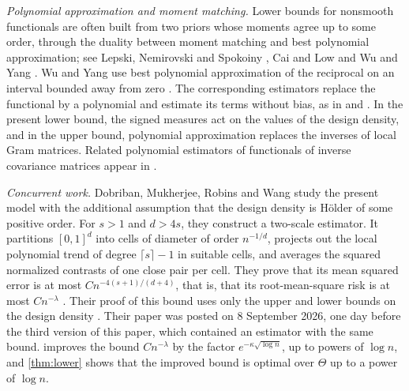 \emph{Polynomial approximation and moment matching.} Lower bounds for
nonsmooth functionals are often built from two priors whose moments
agree up to some order, through the duality between moment matching
and best polynomial approximation; see Lepski, Nemirovski and Spokoiny
\cite[Section~4.4]{LepskiEtAl1999}, Cai and Low \cite{CaiLow2011} and
Wu and Yang \cite{WuYang2019}. Wu and Yang use best polynomial
approximation of the reciprocal on an interval bounded away from zero
\cite[Appendix~A]{WuYang2019}. The corresponding estimators replace the
functional by a polynomial and estimate its terms without bias, as in
\cite[Section~4.1]{CaiLow2011} and \cite{JiaoEtAl2015}. In the present
lower bound, the signed measures act on the values of the design
density, and in the upper bound, polynomial approximation replaces the
inverses of local Gram matrices. Related polynomial estimators of
functionals of inverse covariance matrices appear in
\cite{KongValiant2018,ChenLiuMukherjee2024}.

\emph{Concurrent work.} Dobriban, Mukherjee, Robins and Wang
\cite{DobribanEtAl2026} study the present model with the additional
assumption that the design density is H\"older of some positive order.
For $s>1$ and $d>4s$, they construct a two-scale estimator. It
partitions $[0,1]^d$ into cells of diameter of order $n^{-1/d}$,
projects out the local polynomial trend of degree $\lceil s\rceil-1$ in
suitable cells, and averages the squared normalized contrasts of one
close pair per cell. They prove that its mean squared error is at most
$Cn^{-4(s+1)/(d+4)}$, that is, that its root-mean-square risk is at most
$Cn^{-\lambda}$ \cite[Section~3.3, Proposition~3.4]{DobribanEtAl2026}.
Their proof of this bound uses only the upper and lower bounds on the
design density \cite[Appendix~A.5]{DobribanEtAl2026}. Their paper was
posted on 8 September 2026, one day before the third version of this paper,
which contained an estimator with the same bound.  improves the bound
$Cn^{-\lambda}$ by the factor $e^{-\kappa\sqrt{\log n}}$, up to powers
of $\log n$, and \cref{thm:lower} shows that the improved bound is
optimal over $\Theta$ up to a power of $\log n$.

